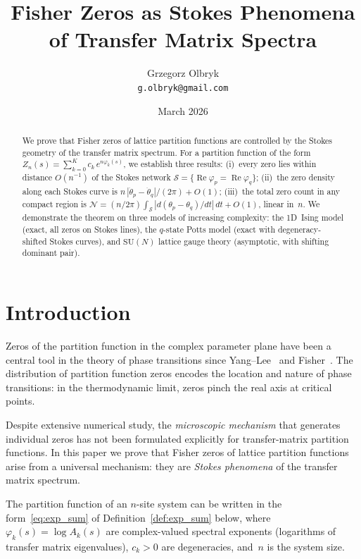 \documentclass[12pt]{article}
\title{Fisher Zeros as Stokes Phenomena\\of Transfer Matrix Spectra}
\author{Grzegorz Olbryk\\[-2pt]
\small\texttt{g.olbryk@gmail.com}}
\date{March 2026}
\theoremstyle{definition}
\theoremstyle{remark}
\newcommand{\SU}{\mathrm{SU}}
\newcommand{\re}{\operatorname{Re}}
\begin{document}
\maketitle

\begin{abstract}
We prove that Fisher zeros of lattice partition functions are
controlled by the Stokes geometry of the transfer matrix spectrum.
For a partition function of the form
$Z_n(s) = \sum_{k=0}^{K} c_k\,e^{n\varphi_k(s)}$,
we establish three results:
(i)~every zero lies within distance $O(n^{-1})$ of the Stokes network
$\mathcal{S} = \{\re\varphi_p = \re\varphi_q\}$;
(ii)~the zero density along each Stokes curve is
$n\,|\dot\theta_p - \dot\theta_q|/(2\pi) + O(1)$;
(iii)~the total zero count in any compact region is
$\mathcal{N} = (n/2\pi)\int_{\mathcal{S}}|d(\theta_p - \theta_q)/dt|\,dt + O(1)$,
linear in~$n$.
We demonstrate the theorem on three models of increasing complexity:
the 1D~Ising model (exact, all zeros on Stokes lines),
the $q$-state Potts model (exact with degeneracy-shifted Stokes curves),
and $\SU(N)$ lattice gauge theory (asymptotic, with shifting
dominant pair).
\end{abstract}


\section{Introduction}
\label{sec:intro}

Zeros of the partition function in the complex parameter plane have
been a central tool in the theory of phase transitions since
Yang--Lee~\cite{YangLee1952} and Fisher~\cite{Fisher1965}.  The
distribution of partition function zeros encodes the location and
nature of phase transitions: in the thermodynamic limit, zeros pinch
the real axis at critical points.

Despite extensive numerical study, the \emph{microscopic mechanism}
that generates individual zeros has not been formulated explicitly
for transfer-matrix partition functions.  In this paper we prove that Fisher zeros of
lattice partition functions arise from a universal mechanism: they
are \emph{Stokes phenomena} of the transfer matrix spectrum.

The partition function of an $n$-site system can be written in the
form~\eqref{eq:exp_sum} of Definition~\ref{def:exp_sum} below,
where $\varphi_k(s) = \log A_k(s)$ are complex-valued spectral
exponents (logarithms of transfer matrix eigenvalues), $c_k > 0$
are degeneracies, and~$n$ is the system size.
\end{document}
